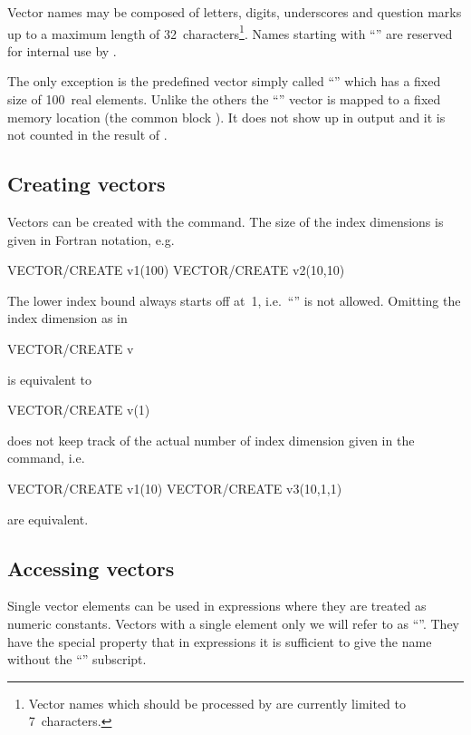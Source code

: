 Vector names may be composed of letters, digits, underscores and
question marks up to a maximum length of 32~characters\footnote{
Vector names which should be processed by \SIGMA{} are currently
limited to 7~characters.
}.
Names starting with ``'' are reserved for internal use by
\KUIP{}.

The only exception is the predefined vector simply called ``''
which has a fixed size of 100~real elements.
Unlike the others the ``'' vector is mapped to a fixed memory
location (the common block ).
It does not show up in  output and it is not counted
in the result of .


\subsection{Creating vectors}

Vectors can be created with the  command.
The size of the index dimensions is given in Fortran notation, e.g.\
\begin{XMP}
VECTOR/CREATE v1(100)
VECTOR/CREATE v2(10,10)
\end{XMP}
The lower index bound always starts off at~1, i.e.\ 
``'' is not allowed.
Omitting the index dimension as in
\begin{XMP}
VECTOR/CREATE v
\end{XMP}
is equivalent to
\begin{XMP}
VECTOR/CREATE v(1)
\vspace{-1cm}
\end{XMP}

\KUIP{} does not keep track of the actual number of index dimension given in
the \Cind{VECTOR/CREATE} command, i.e.\
\condbreak{3\baselineskip}
\begin{XMP}
VECTOR/CREATE v1(10)
VECTOR/CREATE v3(10,1,1)
\end{XMP}
are equivalent.


\subsection{Accessing vectors}

Single vector elements can be used in \KUIP{} expressions where they
are treated as numeric constants.
Vectors with a single element only we will refer to as
``\textem{scalar vectors}''.  
They have the special property that in expressions it is sufficient to
give the name without the ``\Lit{(1)}'' subscript.

